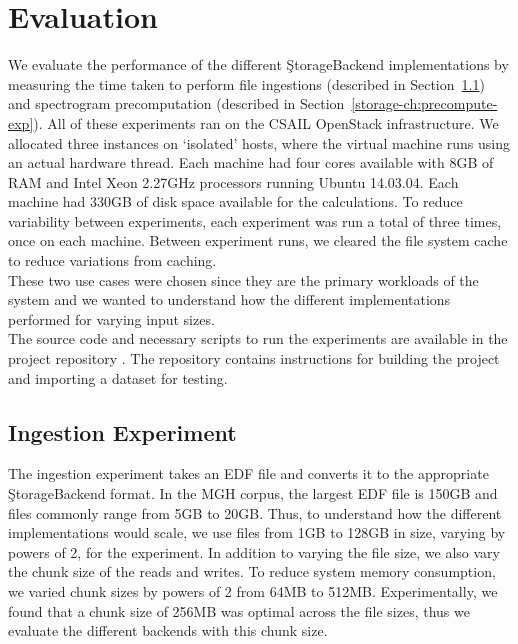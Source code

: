 \section{Evaluation}\label{storage-ch:evaluation}

We evaluate the performance of the different \c{StorageBackend} implementations
by measuring the time taken to perform file ingestions (described in
Section~\ref{storage-ch:ingestion-exp}) and spectrogram precomputation
(described in Section~\ref{storage-ch:precompute-exp}). All of these
experiments ran on the CSAIL OpenStack infrastructure. We allocated three
instances on `isolated' hosts, where the virtual machine runs using an actual
hardware thread. Each machine had four cores available with 8GB of RAM and
Intel Xeon 2.27GHz processors running Ubuntu 14.03.04. Each machine had 330GB
of disk space available for the calculations. To reduce variability between
experiments, each experiment was run a total of three times, once on each
machine. Between experiment runs, we cleared the file system cache to reduce
variations from caching. \\

These two use cases were chosen since they are the primary workloads of the
system and we wanted to understand how the different implementations performed
for varying input sizes.\\

The source code and necessary scripts to run the experiments are available
in the project repository \cite{eeg-toolkit}. The repository contains
instructions for building the project and importing a dataset for testing.

\subsection{Ingestion Experiment}\label{storage-ch:ingestion-exp}

The ingestion experiment takes an EDF file and converts it to the appropriate
\c{StorageBackend} format. In the MGH corpus, the largest EDF file is 150GB and
files commonly range from 5GB to 20GB. Thus, to understand how the different
implementations would scale, we use files from 1GB to 128GB in size, varying by
powers of 2, for the experiment. In addition to varying the file size, we also
vary the chunk size of the reads and writes. To reduce system memory
consumption, we varied chunk sizes by powers of 2 from 64MB to 512MB.
Experimentally, we found that a chunk size of 256MB was optimal across the file
sizes, thus we evaluate the different backends with this chunk size. \\

